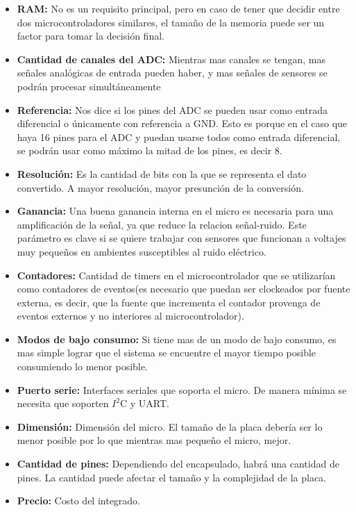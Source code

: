 \begin{itemize}
  \item \textbf{RAM:} No es un requisito principal, pero en caso de tener que decidir entre dos microcontroladores similares, el tamaño de la memoria puede ser un factor para tomar la decisión final.
  \item \textbf{Cantidad de canales del ADC:} Mientras mas canales se tengan, mas señales analógicas de entrada pueden haber, y mas señales de sensores se podrán procesar simultáneamente
  \item \textbf{Referencia:} Nos dice si los pines del ADC se pueden usar como entrada diferencial o únicamente con referencia a GND. Esto es porque en el caso que haya 16 pines para el ADC y puedan usarse todos como entrada diferencial, se podrán usar como máximo la mitad de los pines, es decir 8.
  \item \textbf{Resolución:} Es la cantidad de bits con la que se representa el dato convertido. A mayor resolución, mayor presunción de la conversión.
  \item \textbf{Ganancia:} Una buena ganancia interna en el micro es necesaria para una amplificación de la señal, ya que reduce la relacion señal-ruido. Este parámetro es clave si se quiere trabajar con sensores que funcionan a voltajes muy pequeños en ambientes susceptibles al ruido eléctrico.
  \item \textbf{Contadores:} Cantidad de timers en el microcontrolador que se utilizarían como contadores de eventos(es necesario que puedan ser clockeados por fuente externa, es decir, que la fuente que incrementa el contador provenga de eventos externos y no interiores al microcontrolador).
  \item \textbf{Modos de bajo consumo:} Si tiene mas de un modo de bajo consumo, es mas simple lograr que el sistema se encuentre el mayor tiempo posible consumiendo lo menor posible.
  \item \textbf{Puerto serie:} Interfaces seriales que soporta el micro. De manera mínima se necesita que soporten $I^{2}$C y UART.
  \item \textbf{Dimensión:} Dimensión del micro. El tamaño de la placa debería ser lo menor posible por lo que mientras mas pequeño el micro, mejor.
  \item \textbf{Cantidad de pines:} Dependiendo del encapsulado, habrá una cantidad de pines. La cantidad puede afectar el tamaño y la complejidad de la placa.
  \item \textbf{Precio:} Costo del integrado.
\end{itemize}

